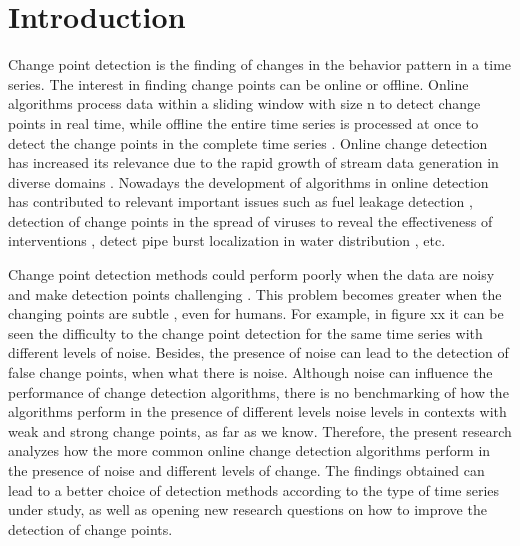 \documentclass[journal,article,submit,pdftex,moreauthors]{Definitions/mdpi}
\begin{document}
\setcounter{section}{0} %


\section{Introduction}

Change point detection is the finding of changes in the behavior pattern in a time series. The interest in finding change points can be online or offline. Online algorithms process data within a sliding window with size n to detect change points in real time, while offline the entire time series is processed at once to detect the change points in the complete time series \cite{aminikhanghahi2017survey}. Online change detection has increased its relevance due to the rapid growth of stream data generation in diverse domains \cite{namoano2019online}. Nowadays the development of algorithms in online detection has contributed to relevant important issues such as fuel leakage detection \cite{chu2025real}, detection of change points in the spread of viruses to reveal the effectiveness of interventions \cite{dehning2020inferring}, detect pipe burst localization in water distribution \cite{mzembegwa2024real}, etc. \par

Change point detection methods could perform poorly when the data are noisy \cite{chen2016general} and make detection points challenging \cite{gold2018doubly}. This problem becomes greater when the changing points are subtle \cite{chu2025real}, even for humans. For example, in figure xx it can be seen the difficulty to the change point detection for the same time series with different levels of noise. Besides, the presence of noise can lead to the detection of false change points, when what there is noise. Although noise can influence the performance of change detection algorithms, there is no benchmarking of how the algorithms perform in the presence of different levels noise levels in contexts with weak and strong change points, as far as we know. Therefore, the present research analyzes how the more common online change detection algorithms perform in the presence of noise and different levels of change.  The findings obtained can lead to a better choice of detection methods according to the type of time series under study, as well as opening new research questions on how to improve the detection of change points.\par
\end{document}
